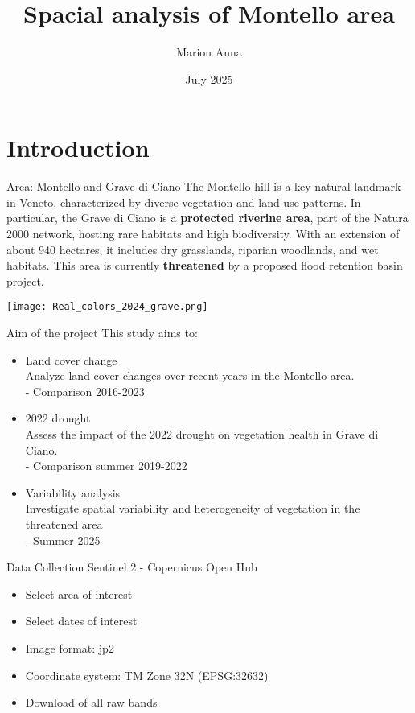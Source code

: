 \documentclass{beamer}
\title{Spacial analysis of Montello area}
\author{Marion Anna}
\date{July 2025}
\begin{document}
\maketitle


\section{Introduction}

\begin{frame}{Area: Montello and Grave di Ciano}
The Montello hill is a key natural landmark in Veneto, characterized by diverse vegetation and land use patterns. In particular, the Grave di Ciano is a \textbf{protected riverine area}, part of the Natura 2000 network, hosting rare habitats and high biodiversity. With an extension of about 940 hectares, it includes dry grasslands, riparian woodlands, and wet habitats. This area is currently \textbf{threatened} by a proposed flood retention basin project.

\end{frame}

\begin{frame}
\texttt{[image: Real\_colors\_2024\_grave.png]}
\end{frame}

\begin{frame}{Aim of the project}
This study aims to:
\begin{itemize}
        \item Land cover change \\
        Analyze land cover changes over recent years in the Montello area.\\
        - Comparison 2016-2023
        \bigskip
        \item 2022 drought \\
        Assess the impact of the 2022 drought on vegetation health in Grave di Ciano.\\
        - Comparison summer 2019-2022
        \bigskip
        \item Variability analysis \\
        Investigate spatial variability and heterogeneity of vegetation in the threatened area \\
        - Summer 2025
        \bigskip
    \end{itemize}
\end{frame}

\begin{frame}{Data Collection}
Sentinel 2 - Copernicus Open Hub
\begin{itemize}
    \item Select area of interest
    \item Select dates of interest
    \item Image format: jp2
    \item Coordinate system: TM Zone 32N (EPSG:32632)
    \item Download of all raw bands
\end{itemize}
\end{frame}
\end{document}
